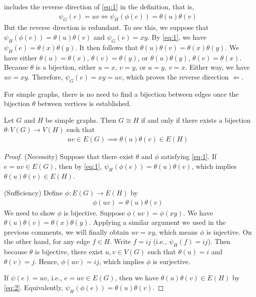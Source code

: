 \documentclass[thmcnt=section, 12pt, color=cyan]{my-elegantbook}
\begin{document}
\parencite{bondyGraphTheoryApplications1976} includes the reverse direction of \eqref{eq:1} in the definition, that is, 
\begin{align*}
    \psi_G(e) = u v
    \iff \psi_H(\phi(e)) = \theta(u) \theta(v)
\end{align*}
But the reverse direction is redundant. To see this, we suppose that $\psi_H(\phi(e)) = \theta(u) \theta(v)$ and $\psi_G(e) = xy$. By \eqref{eq:1}, we have $\psi_H(e) = \theta(x) \theta(y)$. It then follows that $\theta(u) \theta(v) = \theta(x) \theta(y)$. We have either $\theta(u) = \theta(x)$, $\theta(v) = \theta(y)$, or $\theta(u) \theta(y)$, $\theta(v) = \theta(x)$. Because $\theta$ is a bijection, either $u=x$, $v=y$, or $u=y$, $v=x$. Either way, we have $uv = xy$. Therefore, $\psi_G(e) = x y = u v$, which proves the reverse direction $\Leftarrow$.

For simple graphs, there is no need to find a bijection between edges once the bijection $\theta$ between vertices is established.

\begin{proposition} \label{pro:1}
    Let $G$ and $H$ be simple graphs. Then $G \cong H$ if and only if there exists a bijection $\theta: V(G) \to V(H)$ such that 
    \begin{align}
        u v \in E(G)
        \implies \theta(u) \theta(v) \in E(H)
        \label{eq:2}
    \end{align}
\end{proposition}

\begin{proof}
    (Necessity) Suppose that there exist $\theta$ and $\phi$ satisfying \eqref{eq:1}. If $e = u v \in E(G)$, then by \eqref{eq:1}, $\psi_H(\phi(e)) = \theta(u) \theta(v)$, which implies $\theta(u) \theta(v) \in E(H)$.

    (Sufficiency) Define $\phi: E(G) \to E(H)$ by 
    \begin{align*}
        \phi(u v) = \theta(u) \theta(v)
    \end{align*}
    We need to show $\phi$ is bijective. Suppose $\phi(u v) = \phi(x y)$. We have $\theta(u) \theta(v) = \theta(x) \theta(y)$. Applying a similar argument we used in the previous comments, we will finally obtain $u v = x y$, which means $\phi$ is injective. On the other hand, for any edge $f \in H$. Write $f = ij$ (i.e., $\psi_H(f) = ij$). Then because $\theta$ is bijective, there exist $u, v \in V(G)$ such that $\theta(u) = i$ and $\theta(v) = j$. Hence, $\phi(u v) = ij$, which implies $\phi$ is surjective.

    If $\psi(e) = uv$, i.e., $e = uv \in E(G)$, then we have $\theta(u) \theta(v) \in E(H)$ by \eqref{eq:2}. Equivalently, $\psi_H(\phi(e)) = \theta(u) \theta(v)$.
\end{proof}
\end{document}
